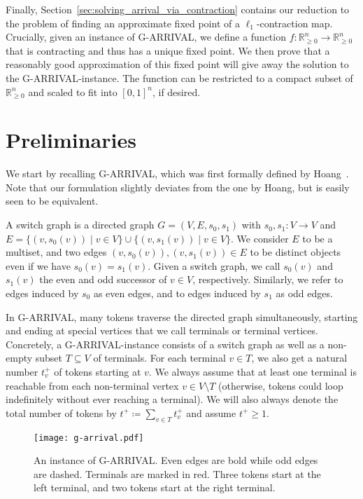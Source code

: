 \documentclass[a4paper,UKenglish,cleveref, autoref, thm-restate]{lipics-v2021}
\newcommand{\R}{\mathbb{R}}
\newcommand{\problem}[1]{\textrm{#1}}
\newcommand{\garrival}{\problem{G-ARRIVAL}}
\begin{document}
Finally, Section~\ref{sec:solving_arrival_via_contraction} contains our reduction to the problem of finding an approximate fixed point of a $\ell_1$-contraction map. Crucially, given an instance of \garrival, we define a function $f : \R^n_{\geq 0} \rightarrow \R^n_{\geq 0}$ that is contracting and thus has a unique fixed point. We then prove that a reasonably good approximation of this fixed point will give away the solution to the \garrival-instance. The function can be restricted to a compact subset of $\R^n_{\geq 0}$ and scaled to fit into $[0, 1]^n$, if desired.

\section{Preliminaries}
\label{sec:preliminaries}

We start by recalling \garrival, which was first formally defined by Hoang~\cite{hoangTwoCombinatorialReconfiguration2022}. Note that our formulation slightly deviates from the one by Hoang, but is easily seen to be equivalent.

A switch graph is a directed graph $G = (V, E, s_0, s_1)$ with $s_0, s_1 : V \rightarrow V$ and $E = \{ (v, s_0(v)) \mid v \in V \} \cup \{ (v, s_1(v)) \mid v \in V \}$.
We consider $E$ to be a multiset, and two edges $(v, s_0(v)), (v, s_1(v)) \in E$ to be distinct objects even if we have $s_0(v) = s_1(v)$. Given a switch graph, we call $s_0(v)$ and $s_1(v)$ the even and odd successor of $v \in V$, respectively. Similarly, we refer to edges induced by $s_0$ as even edges, and to edges induced by $s_1$ as odd edges. 

In \garrival, many tokens traverse the directed graph simultaneously, starting and ending at special vertices that we call terminals or terminal vertices. Concretely, a \garrival-instance consists of a switch graph as well as a non-empty subset $T \subseteq V$ of terminals. For each terminal $v \in T$, we also get a natural number $t^+_v$ of tokens starting at $v$. We always assume that at least one terminal is reachable from each non-terminal vertex $v \in V \setminus T$ (otherwise, tokens could loop indefinitely without ever reaching a terminal). We will also always denote the total number of tokens by $t^+ \coloneqq \sum_{v \in T} t^+_v$ and assume $t^+ \geq 1$.

\begin{figure}[ht]
    \centering
    \texttt{[image: g-arrival.pdf]}
    \caption{An instance of \garrival. Even edges are bold while odd edges are dashed. Terminals are marked in red. Three tokens start at the left terminal, and two tokens start at the right terminal. }
    \label{fig:g-arrival}
\end{figure}
\end{document}
